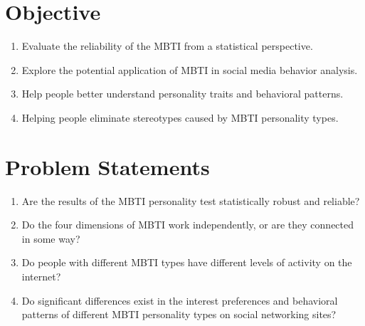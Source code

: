 \documentclass[12pt]{article}
\begin{document}
	\section{Objective}
	\begin{enumerate} 
		\item Evaluate the reliability of the MBTI from a statistical perspective.    \item Explore the potential application of MBTI in social media behavior analysis.    
		\item Help people better understand personality traits and behavioral patterns.    
		\item Helping people eliminate stereotypes caused by MBTI personality types.
	\end{enumerate}
	
	\section{Problem Statements}
	\begin{enumerate}
		\item Are the results of the MBTI personality test statistically robust and reliable?
		\item Do the four dimensions of MBTI work independently, or are they connected in some way?
		\item Do people with different MBTI types have different levels of activity on the internet?
		\item Do significant differences exist in the interest preferences and behavioral patterns of different MBTI personality types on social networking sites?
	\end{enumerate}
	
\end{document}
